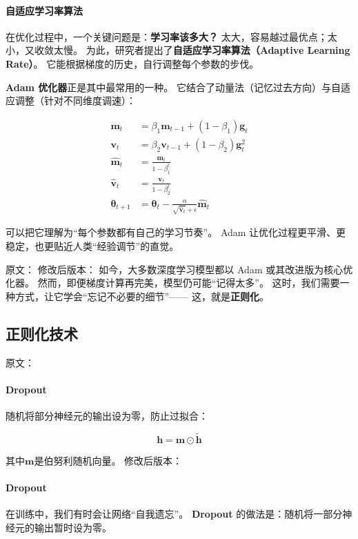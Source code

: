 \paragraph{自适应学习率算法}  
在优化过程中，一个关键问题是：\textbf{学习率该多大？}  
太大，容易越过最优点；太小，又收敛太慢。  
为此，研究者提出了\textbf{自适应学习率算法（Adaptive Learning Rate）}。  
它能根据梯度的历史，自行调整每个参数的步伐。  

\textbf{Adam 优化器}正是其中最常用的一种。  
它结合了动量法（记忆过去方向）与自适应调整（针对不同维度调速）：  

\begin{align}
\mathbf{m}_t &= \beta_1 \mathbf{m}_{t-1} + (1-\beta_1) \mathbf{g}_t \\
\mathbf{v}_t &= \beta_2 \mathbf{v}_{t-1} + (1-\beta_2) \mathbf{g}_t^2 \\
\hat{\mathbf{m}}_t &= \frac{\mathbf{m}_t}{1-\beta_1^t} \\
\hat{\mathbf{v}}_t &= \frac{\mathbf{v}_t}{1-\beta_2^t} \\
\boldsymbol{\theta}_{t+1} &= \boldsymbol{\theta}_t - \frac{\alpha}{\sqrt{\hat{\mathbf{v}}_t} + \epsilon} \hat{\mathbf{m}}_t
\end{align}

可以把它理解为“每个参数都有自己的学习节奏”。  
Adam 让优化过程更平滑、更稳定，也更贴近人类“经验调节”的直觉。



原文：
修改后版本：
如今，大多数深度学习模型都以 Adam 或其改进版为核心优化器。  
然而，即便梯度计算再完美，模型仍可能“记得太多”。  
这时，我们需要一种方式，让它学会“忘记不必要的细节”——  
这，就是\textbf{正则化}。

\subsection{正则化技术}

原文：
\paragraph{Dropout}
随机将部分神经元的输出设为零，防止过拟合：

$$\mathbf{h} = \mathbf{m} \odot \tilde{\mathbf{h}}$$

其中$\mathbf{m}$是伯努利随机向量。
修改后版本：
\paragraph{Dropout}  
在训练中，我们有时会让网络“自我遗忘”。  
\textbf{Dropout} 的做法是：随机将一部分神经元的输出暂时设为零。  

